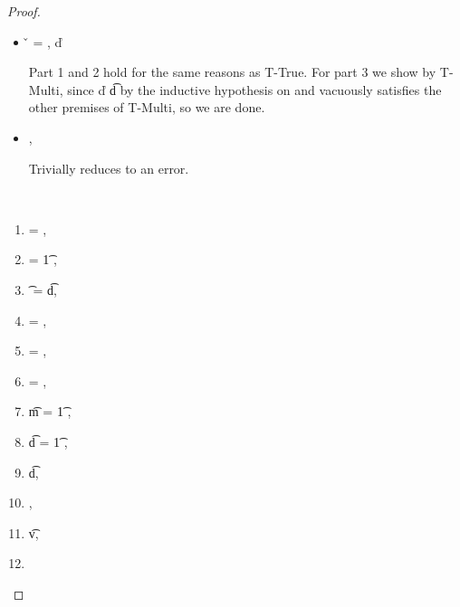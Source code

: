 \begin{lemma}
\begin{proof}
\begin{case}[T-DefMulti]
\begin{itemize}
  \item[]
\begin{subcase}[B-DefMulti]
  \v{} = { {\emptydisptable}},
  \opsem {\openv{}} {} {\v{d}}


Part 1 and 2 hold for the same reasons as T-True.
For part 3 we show 
by T-Multi, since \judgementtwo {} {\v{d}} {\t{d}} by the inductive hypothesis on {}
and {\emptydisptable} vacuously satisfies the other premises of T-Multi, so we are done.

\end{subcase}
  \item[]
\begin{subcase}[BE-DefMulti] \opsem {\openv{}} {} {\errorvalv{}},
        \opsem {\openv{}} {\e{}} {\errorvalv{}}

        Trivially reduces to an error.

\end{subcase}
\end{itemize}
\end{case}

\begin{case}[T-DefMethod]
        \ 

        \begin{enumerate}
          \item
  \e{} = { {} {}},
          \item
   = {\abs {\x{}} {\t{1}} {}},
          \item
  \t{} = { {\t{d}}},
          \item
  \thenprop{\prop{}} = {\topprop{}},
          \item
  \elseprop{\prop{}} = {\botprop{}},
          \item
  \object{} = {\emptyobject{}},
          \item
  \t{m} = {\ArrowOne {\x{}} {\t{1}} {\s{}}
                     {
                                 {}}
                     {}},
          \item
  \t{d} = {\ArrowOne {\x{}} {\t{1}} {\sp{}}
                     {
                                 {}}
                     {}},
          \item
  \judgementtwo {\propenv{}} {} { {\t{d}}},
          \item
  ,
          \item
  \judgementtwo {\propenv{}}
               {} {\t{v}},
          \item
           {} {\s{}}
           {
                       {}}
           {}
        \end{enumerate}


\end{case}
\end{proof}
\end{lemma}
